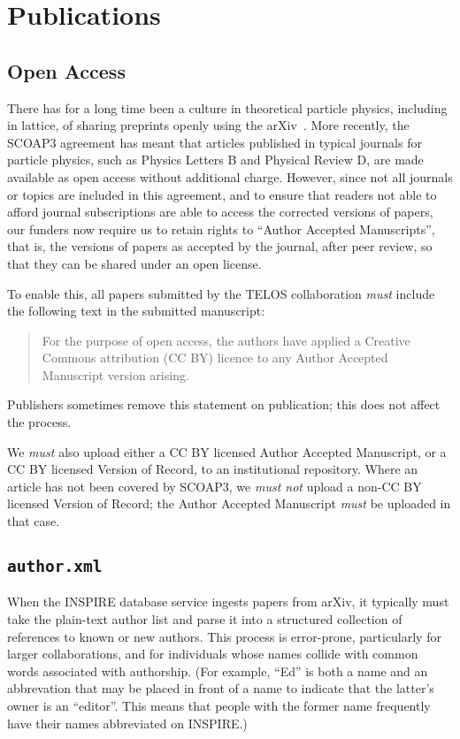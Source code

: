 \documentclass{article}
\newcommand\rfcword[1]{\emph{#1}\xspace}
\newcommand\must{\rfcword{must}}
\newcommand\mustnot{\rfcword{must not}}
\newcommand\filename[1]{\texttt{#1}\xspace}
\newcommand\authorxml{\filename{author.xml}\xspace}
\begin{document}
\section{Publications}

\subsection{Open Access}

There has for a long time been a culture in theoretical particle physics,
including in lattice,
of sharing preprints openly using the arXiv~\cite{ginsparg2021lessons}.
More recently,
the SCOAP3 agreement has meant that
articles published in
typical journals for particle physics,
such as Physics Letters B and Physical Review D,
are made available as open access without additional charge.
However,
since not all journals or topics are included in this agreement,
and to ensure
that readers not able to afford journal subscriptions
are able to access the corrected versions of papers,
our funders now require us to retain rights to
``Author Accepted Manuscripts'',
that is,
the versions of papers as accepted by the journal,
after peer review,
so that they can be shared under an open license.

To enable this,
all papers submitted by the TELOS collaboration
\must include the following text in the submitted manuscript:

\begin{quote}
  For the purpose of open access,
  the authors have applied a Creative Commons attribution (CC BY) licence
  to any Author Accepted Manuscript version arising.
\end{quote}

Publishers sometimes remove this statement on publication;
this does not affect the process.

We \must also upload either a CC BY licensed Author Accepted Manuscript,
or a CC BY licensed Version of Record,
to an institutional repository.
Where an article has not been covered by SCOAP3,
we \mustnot upload a non-CC BY licensed Version of Record;
the Author Accepted Manuscript \must be uploaded in that case.


\subsection{\authorxml}

When the INSPIRE database service ingests papers from arXiv,
it typically must take the plain-text author list
and parse it into a structured collection of references to known or new authors.
This process is error-prone,
particularly for larger collaborations,
and for individuals whose names collide with common words associated with authorship.
(For example,
``Ed'' is both a name
and an abbrevation that may be placed in front of a name
to indicate that the latter's owner is an ``editor''.
This means that people with the former name frequently have their names abbreviated on INSPIRE.)
\end{document}
